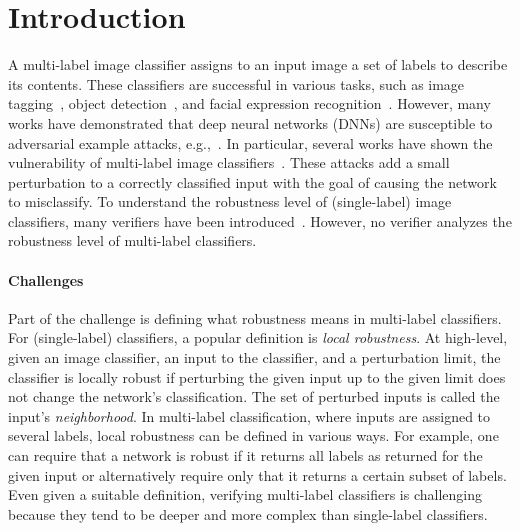 
\section{Introduction}

A multi-label image classifier assigns to an input image a set of labels to describe its contents.
These classifiers are successful in various tasks, such as image tagging~\cite{IMAGETAGGING}, object detection~\cite{ObjectDetection}, and facial expression recognition~\cite{FacialRec}.
However, many works have demonstrated that deep neural networks (DNNs) are susceptible to adversarial example attacks, e.g.,~\cite{ref7,ref15,szegedy2014intriguing,ref17,ref29,ref56}. In particular, several works have shown the vulnerability of multi-label image classifiers~\cite{MultiVul1, MultiVul2, MultiVul3}.
These attacks add a small perturbation to a correctly classified input with the goal of causing the network to misclassify.
To understand the robustness level of (single-label) image classifiers, many verifiers have been introduced~\cite{MIPVERIFY, INCOMPLETE1, INCOMPLETE2, COMPLETE, ABSTRACTINTER}.
However, no verifier analyzes the robustness level of multi-label classifiers. %

\paragraph{Challenges} Part of the challenge is defining what robustness means in multi-label classifiers.
For (single-label) classifiers, a popular definition is \emph{local robustness}.
At high-level, given an image classifier, an input to the classifier, and a perturbation limit, the classifier is locally robust if perturbing the given input up to the given limit does not change the network's classification.
The set of perturbed inputs is called the input's \emph{neighborhood}.
In multi-label classification, where inputs are assigned to several labels, local robustness can be defined in various ways. For example, one can require that a network is robust if it returns all labels as returned for the given input or alternatively require only that it returns a certain subset of labels.
Even given a suitable definition, verifying multi-label classifiers is challenging because they tend to be deeper and more complex than single-label classifiers.

